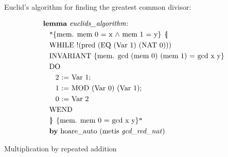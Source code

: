 \documentclass{llncs}
\newcommand{\llbrace}{\hspace{1pt} \lbrace \kern -3pt \vert \hspace{1pt}}
\newcommand{\rrbrace}{\hspace{0.5pt} \rbrace \kern -5pt \vert \hspace{3pt}}
\begin{document}
Euclid's algorithm for finding the greatest common divisor:

\begin{minipage}[T]{0.1\textwidth}
{
\begin{align*}
&\text{\textbf{lemma} \textit{euclids\_algorithm}:}\\
&\hspace{2ex}\text{\texttt{"}\{mem. mem 0 = x $\wedge$ mem 1 = y\} $\llbrace$}\\
&\hspace{2ex}\text{WHILE !(pred (EQ (Var 1) (NAT 0)))}\\
&\hspace{2ex}\text{INVARIANT \{mem. gcd (mem 0) (mem 1) = gcd x y\}}\\
&\hspace{2ex}\text{DO}\\
&\hspace{4ex}\text{2 := Var 1;}\\
&\hspace{4ex}\text{1 := MOD (Var 0) (Var 1);}\\
&\hspace{4ex}\text{0 := Var 2}\\
&\hspace{2ex}\text{WEND}\\
&\hspace{2ex}\text{$\rrbrace$ \{mem. mem 0 = gcd x y\}\texttt{"}}\\
&\hspace{2ex}\text{\textbf{by} hoare\_auto (metis \textit{gcd\_red\_nat})}
\end{align*}
}
\end{minipage}

Multiplication by repeated addition
\end{document}
